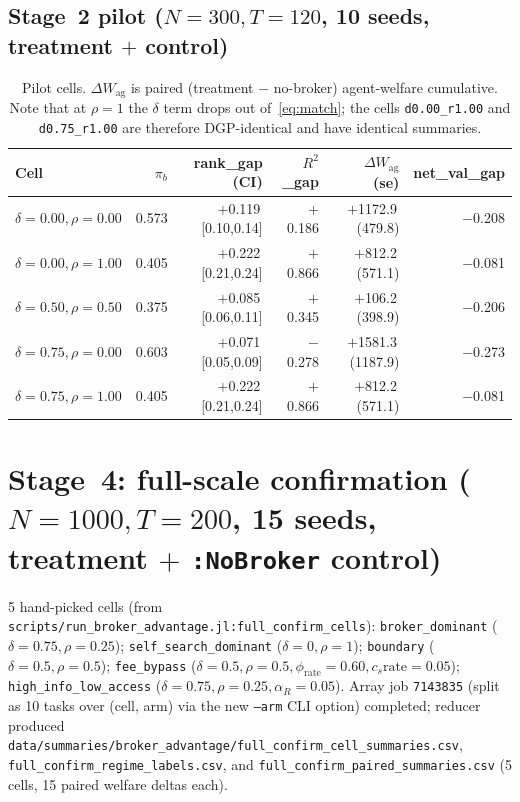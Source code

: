 \documentclass[11pt,a4paper]{article}
\begin{document}
\subsection{Stage~2 pilot ($N{=}300, T{=}120$, 10 seeds, treatment $+$ control)}
\begin{table}[h]\centering\small
\caption{Pilot cells. $\Delta W_{\text{ag}}$ is paired (treatment $-$ no-broker) agent-welfare cumulative. Note that at $\rho{=}1$ the $\delta$ term drops out of~\eqref{eq:match}; the cells \texttt{d0.00\_r1.00} and \texttt{d0.75\_r1.00} are therefore DGP-identical and have identical summaries.}
\label{tab:pilot}
\begin{tabular}{@{}lrrrrr@{}}
\toprule
Cell & $\pi_b$ & rank\_gap (CI) & $R^2$\_gap & $\Delta W_{\text{ag}}$ (se) & net\_val\_gap \\
\midrule
$\delta{=}0.00,\rho{=}0.00$ & 0.573 & $+$0.119\,[0.10,0.14] & $+$0.186 & $+$1172.9\,(479.8) & $-$0.208 \\
$\delta{=}0.00,\rho{=}1.00$ & 0.405 & $+$0.222\,[0.21,0.24] & $+$0.866 & $+$812.2\,(571.1) & $-$0.081 \\
$\delta{=}0.50,\rho{=}0.50$ & 0.375 & $+$0.085\,[0.06,0.11] & $+$0.345 & $+$106.2\,(398.9) & $-$0.206 \\
$\delta{=}0.75,\rho{=}0.00$ & 0.603 & $+$0.071\,[0.05,0.09] & $-$0.278 & $+$1581.3\,(1187.9) & $-$0.273 \\
$\delta{=}0.75,\rho{=}1.00$ & 0.405 & $+$0.222\,[0.21,0.24] & $+$0.866 & $+$812.2\,(571.1) & $-$0.081 \\
\bottomrule
\end{tabular}
\end{table}

\section{Stage~4: full-scale confirmation ($N{=}1000, T{=}200$, 15 seeds, treatment $+$ \texttt{:NoBroker} control)}
\label{sec:c5}

5 hand-picked cells (from \texttt{scripts/run\_broker\_advantage.jl:full\_confirm\_cells}): \texttt{broker\_dominant} ($\delta{=}0.75,\rho{=}0.25$); \texttt{self\_search\_dominant} ($\delta{=}0,\rho{=}1$); \texttt{boundary} ($\delta{=}0.5,\rho{=}0.5$); \texttt{fee\_bypass} ($\delta{=}0.5,\rho{=}0.5,\phi_{\text{rate}}{=}0.60,c_s{\text{rate}}{=}0.05$); \texttt{high\_info\_low\_access} ($\delta{=}0.75,\rho{=}0.25,\alpha_R{=}0.05$). Array job \texttt{7143835} (split as 10 tasks over (cell, arm) via the new \texttt{--arm} CLI option) completed; reducer produced \texttt{data/summaries/broker\_advantage/full\_confirm\_cell\_summaries.csv}, \texttt{full\_confirm\_regime\_labels.csv}, and \texttt{full\_confirm\_paired\_summaries.csv} (5 cells, 15 paired welfare deltas each).
\end{document}
